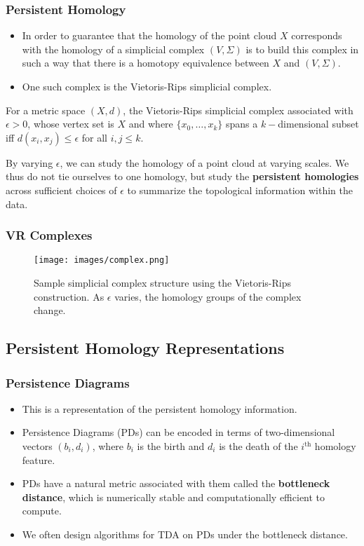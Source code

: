 		\begin{frame}
		\frametitle{Persistent Homology}
		\begin{itemize}
			\item In order to guarantee that the homology of the point cloud $X$ corresponds with the homology of a simplicial complex $(V,\Sigma)$
			is to build this complex in such a way that there is a homotopy equivalence between $X$ and $(V,\Sigma)$.
			\item One such complex is the Vietoris-Rips simplicial complex.
			\end{itemize}
			
			\begin{defn}			
			For a metric space $(X,d)$, the Vietoris-Rips simplicial complex associated with $\epsilon>0$, whose vertex set is $X$ and where $\{x_0,\ldots,x_k\}$ spans a $k-$dimensional subset iff $d(x_i,x_j)\leq\epsilon$ for all $i,j\leq k$.
			\end{defn}
			
			By varying $\epsilon$, we can study the homology of a point cloud at varying scales. We thus do not tie ourselves to one homology, but study the \textbf{persistent homologies} across sufficient choices of $\epsilon$ to summarize the topological information within the data.
		\end{frame}
		
				\begin{frame}
		\frametitle{VR Complexes}
		
				\begin{figure}
				\centering
				\texttt{[image: images/complex.png]}
				\caption{Sample simplicial complex structure using the Vietoris-Rips construction. As $\epsilon$ varies, the homology groups of the complex change.}
		\end{figure}
		\end{frame}
		
	\subsection{Persistent Homology Representations}
		\begin{frame}
		\frametitle{Persistence Diagrams}
		\begin{itemize}
			\item This is a representation of the persistent homology information.
			\item Persistence Diagrams (PDs) can be encoded in terms of two-dimensional vectors $(b_i,d_i)$, where $b_i$ is the birth and $d_i$ is the death of the $i^{\text{th}}$ homology feature.
			\item PDs have a natural metric associated with them called the \textbf{bottleneck distance}, which is numerically stable and computationally efficient to compute.
			\item We often design algorithms for TDA on PDs under the bottleneck distance.
		\end{itemize}
		
		\end{frame}
		

